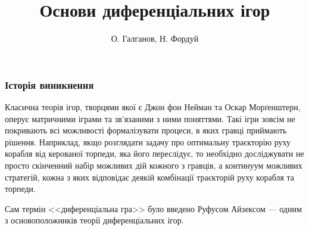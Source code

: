 \documentclass[10pt,pdf]{beamer}
\title{Основи диференціальних ігор}
\author{О. Галганов, Н. Фордуй}
\date{}
\begin{document}
    \begin{frame}
        \titlepage
    \end{frame}
    \begin{frame}
        \frametitle{Історія виникнення}
        Класична теорія ігор, творцями якої є Джон фон Нейман та Оскар Морґенштерн,
        оперує матричними іграми та зв'язаними з ними поняттями. Такі ігри зовсім не покривають всі можливості формалізувати процеси,
        в яких гравці приймають рішення. Наприклад, якщо розглядати задачу про оптимальну траєкторію руху
        корабля від керованої торпеди, яка його переслідує, то необхідно досліджувати не просто скінченний набір можливих дій
        кожного з гравців, а континуум можливих стратегій, кожна з яких відповідає деякій комбінації траєкторій руху корабля та торпеди.

        Сам термін <<диференціальна гра>> було введено Руфусом Айзексом --- одним з основоположників теорії диференціальних ігор.
    \end{frame}
\end{document}
